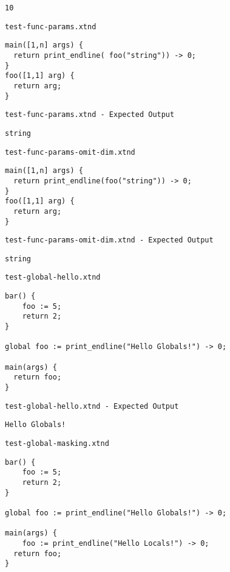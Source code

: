 \begin{lstlisting}
10
\end{lstlisting}


\medskip \noindent \texttt{test-func-params.xtnd}


\begin{lstlisting}
main([1,n] args) {
  return print_endline( foo("string")) -> 0;
}
foo([1,1] arg) {
  return arg;
}
\end{lstlisting}


\medskip \noindent \texttt{test-func-params.xtnd - Expected Output}


\begin{lstlisting}
string
\end{lstlisting}


\medskip \noindent \texttt{test-func-params-omit-dim.xtnd}


\begin{lstlisting}
main([1,n] args) {
  return print_endline(foo("string")) -> 0;
}
foo([1,1] arg) {
  return arg;
}
\end{lstlisting}


\medskip \noindent \texttt{test-func-params-omit-dim.xtnd - Expected Output}


\begin{lstlisting}
string
\end{lstlisting}


\medskip \noindent \texttt{test-global-hello.xtnd}


\begin{lstlisting}
bar() {
	foo := 5;
	return 2;
}

global foo := print_endline("Hello Globals!") -> 0;

main(args) {
  return foo;
}
\end{lstlisting}


\medskip \noindent \texttt{test-global-hello.xtnd - Expected Output}


\begin{lstlisting}
Hello Globals!
\end{lstlisting}


\medskip \noindent \texttt{test-global-masking.xtnd}


\begin{lstlisting}
bar() {
	foo := 5;
	return 2;
}

global foo := print_endline("Hello Globals!") -> 0;

main(args) {
	foo := print_endline("Hello Locals!") -> 0;
  return foo;
}
\end{lstlisting}


